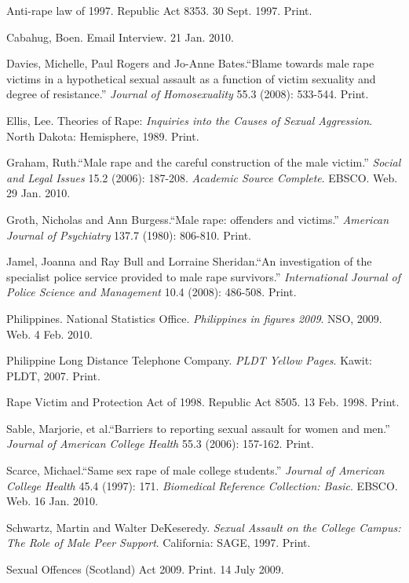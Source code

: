\begin{workscited}

\bibent
Anti-rape law of 1997. Republic Act 8353. 30 Sept. 1997. Print.

\bibent
Cabahug, Boen. Email Interview. 21 Jan. 2010.
	
\bibent
Davies, Michelle, Paul Rogers and Jo-Anne Bates.``Blame towards male rape victims in a hypothetical sexual assault as a function of victim sexuality and degree of resistance.'' \textit{Journal of Homosexuality} 55.3 (2008): 533-544. Print.

\bibent
Ellis, Lee. Theories of Rape: \textit{Inquiries into the Causes of Sexual Aggression}. North Dakota: Hemisphere, 1989. Print.

\bibent
Graham, Ruth.``Male rape and the careful construction of the male victim.'' \textit{Social and Legal Issues} 15.2 (2006): 187-208. \textit{Academic Source Complete}. EBSCO. Web. 29 Jan. 2010.

\bibent
Groth, Nicholas and Ann Burgess.``Male rape: offenders and victims.'' \textit{American Journal of Psychiatry} 137.7 (1980): 806-810. Print.

\bibent
Jamel, Joanna and Ray Bull and Lorraine Sheridan.``An investigation of the specialist police service provided to male rape survivors.'' \textit{International Journal of Police Science and Management} 10.4 (2008): 486-508. Print.

\bibent
Philippines. National Statistics Office. \textit{Philippines in figures 2009}. NSO, 2009. Web. 4 Feb. 2010.

\bibent
Philippine Long Distance Telephone Company. \textit{PLDT Yellow Pages}. Kawit: PLDT, 2007. Print.

\bibent
Rape Victim and Protection Act of 1998. Republic Act 8505. 13 Feb. 1998. Print.

\bibent
Sable, Marjorie, et al.``Barriers to reporting sexual assault for women and men.'' \textit{Journal of American College Health} 55.3 (2006): 157-162. Print.

\bibent
Scarce, Michael.``Same sex rape of male college students.'' \textit{Journal of American College Health} 45.4 (1997): 171. \textit{Biomedical Reference Collection: Basic}. EBSCO. Web. 16 Jan. 2010.

\bibent
Schwartz, Martin and Walter DeKeseredy. \textit{Sexual Assault on the College Campus: The Role of Male Peer Support}. California: SAGE, 1997. Print.

\bibent
Sexual Offences (Scotland) Act 2009. Print. 14 July 2009.

\end{workscited}
